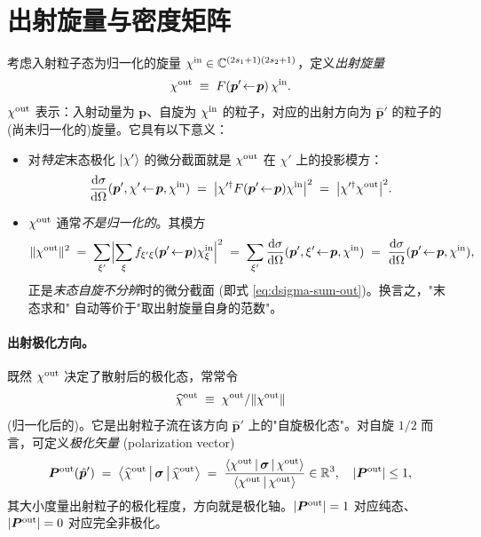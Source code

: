 \section{出射旋量与密度矩阵}\label{sec:outgoing-spinor}

考虑入射粒子态为归一化的旋量 $\chi^{\rm in}\in\mathbb{C}^{(2s_1+1)(2s_2+1)}$，定义\emph{出射旋量}
\begin{equation}
  \chi^{\rm out}\;\equiv\;F(\bm p'\!\leftarrow\!\bm p)\,\chi^{\rm in}.
  \label{eq:chi-out}
\end{equation}
$\chi^{\rm out}$ 表示：入射动量为 $\bm p$、自旋为 $\chi^{\rm in}$ 的粒子，对应的出射方向为 $\hat{\bm p}'$ 的粒子的(尚未归一化的)旋量。它具有以下意义：
\begin{itemize}
  \item 对\emph{特定}末态极化 $\ket{\chi'}$ 的微分截面就是 $\chi^{\rm out}$ 在 $\chi'$ 上的投影模方：
  \begin{equation}
    \frac{\mathrm{d}\sigma}{\mathrm{d}\Omega}(\bm p',\chi'\!\leftarrow\!\bm p,\chi^{\rm in})
    \;=\;\bigl|\chi'^\dagger F(\bm p'\!\leftarrow\!\bm p)\chi^{\rm in}\bigr|^2
    \;=\;\bigl|\chi'^\dagger \chi^{\rm out}\bigr|^2.
    \label{eq:dsigma-from-chi-out}
  \end{equation}
  \item $\chi^{\rm out}$ 通常\emph{不是归一化的}。其模方
  \begin{equation}
    \|\chi^{\rm out}\|^2
    \;=\;\sum_{\xi'}\Bigl|\sum_\xi f_{\xi'\xi}(\bm p'\!\leftarrow\!\bm p)\chi^{\rm in}_\xi\Bigr|^2
    \;=\;\sum_{\xi'}\frac{\mathrm{d}\sigma}{\mathrm{d}\Omega}(\bm p',\xi'\!\leftarrow\!\bm p,\chi^{\rm in})
    \;=\;\frac{\mathrm{d}\sigma}{\mathrm{d}\Omega}(\bm p'\!\leftarrow\!\bm p,\chi^{\rm in}),
    \label{eq:chi-out-norm}
  \end{equation}
  正是\emph{末态自旋不分辨}时的微分截面 (即式 \eqref{eq:dsigma-sum-out})。换言之，"末态求和" 自动等价于"取出射旋量自身的范数"。
\end{itemize}

\paragraph{出射极化方向。}既然 $\chi^{\rm out}$ 决定了散射后的极化态，常常令
\begin{equation}
  \widehat{\chi}^{\rm out}\;\equiv\;\chi^{\rm out}/\|\chi^{\rm out}\|
\end{equation}
(归一化后的)。它是出射粒子流在该方向 $\hat{\bm p}'$ 上的"自旋极化态"。对自旋 $1/2$ 而言，可定义\emph{极化矢量} (polarization vector)
\begin{equation}
  \bm P^{\rm out}(\hat{\bm p}')\;=\;\left\langle \widehat\chi^{\rm out} \,\middle|\, \bm \sigma \,\middle|\, \widehat\chi^{\rm out} \right\rangle
  \;=\;\frac{\left\langle \chi^{\rm out} \,\middle|\, \bm\sigma \,\middle|\, \chi^{\rm out} \right\rangle}{\left\langle \chi^{\rm out} \,\middle|\, \chi^{\rm out} \right\rangle}\in\mathbb{R}^3,\quad |\bm P^{\rm out}|\le 1,
  \label{eq:polarization-vec}
\end{equation}
其大小度量出射粒子的极化程度，方向就是极化轴。$|\bm P^{\rm out}|=1$ 对应纯态、$|\bm P^{\rm out}|=0$ 对应完全非极化。

